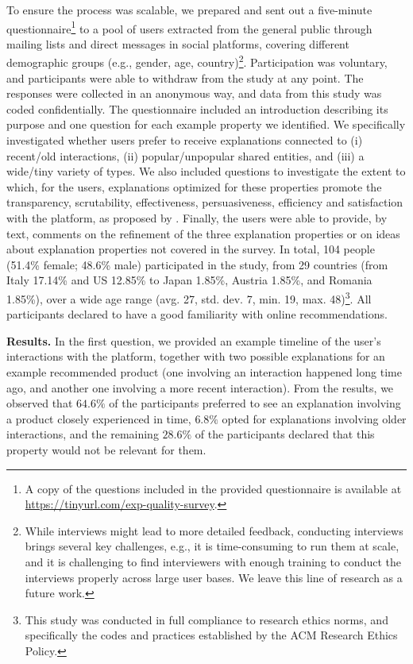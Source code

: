 \documentclass[sigconf]{acmart}
\begin{document}
\vspace{1mm}   
To ensure the process was scalable, we prepared and sent out a five-minute questionnaire\footnote{A copy of the questions included in the provided questionnaire is available at \url{https://tinyurl.com/exp-quality-survey}.} to a pool of users {\color{black} extracted from the general public through mailing lists and direct messages in social platforms}, covering different demographic groups (e.g., gender, age, country)\footnote{While interviews might lead to more detailed feedback, conducting interviews brings several key challenges, e.g., it is time-consuming to run them at scale, and it is challenging to find interviewers with enough training to conduct the interviews properly across large user bases. We leave this line of research as a future work.}.  
Participation was voluntary, and participants were able to withdraw from the study at any point. 
The responses were collected in an anonymous way, and data from this study was coded confidentially. 
The questionnaire included an introduction describing its purpose and one question for each example property we identified.
We specifically investigated whether users prefer to receive explanations connected to (i) recent/old interactions, (ii) popular/unpopular shared entities, and (iii) a wide/tiny variety of types.
We also included questions to investigate the extent to which, for the users, explanations optimized for these properties promote the transparency, scrutability, effectiveness, persuasiveness, efficiency and satisfaction with the platform, as proposed by \cite{Tintarev2007}. Finally, the users were able to provide, by text, comments on the refinement of the three explanation properties or on ideas about explanation properties not covered in the survey. In total, 104 people (51.4\% female; 48.6\% male) participated in the study, from 29 countries (from Italy 17.14\% and US 12.85\% to Japan 1.85\%, Austria 1.85\%, and Romania 1.85\%), over a wide age range (avg. 27, std. dev. 7, min. 19, max. 48)\footnote{This study was conducted in full compliance to research ethics norms, and specifically the codes and practices established by the ACM Research Ethics Policy.}. 
All participants declared to have a good familiarity with online recommendations.

\vspace{1mm}\noindent\textbf{Results.} 
In the first question, we provided an example timeline of the user's interactions with the platform, together with two possible explanations for an example recommended product (one involving an interaction happened long time ago, and another one involving a more recent interaction). 
From the results, we observed that $64.6\%$ of the participants preferred to see an explanation involving a product closely experienced in time, $6.8\%$ opted for explanations involving older interactions, and the remaining $28.6\%$ of the participants declared that this property would not be relevant for them.
\end{document}
